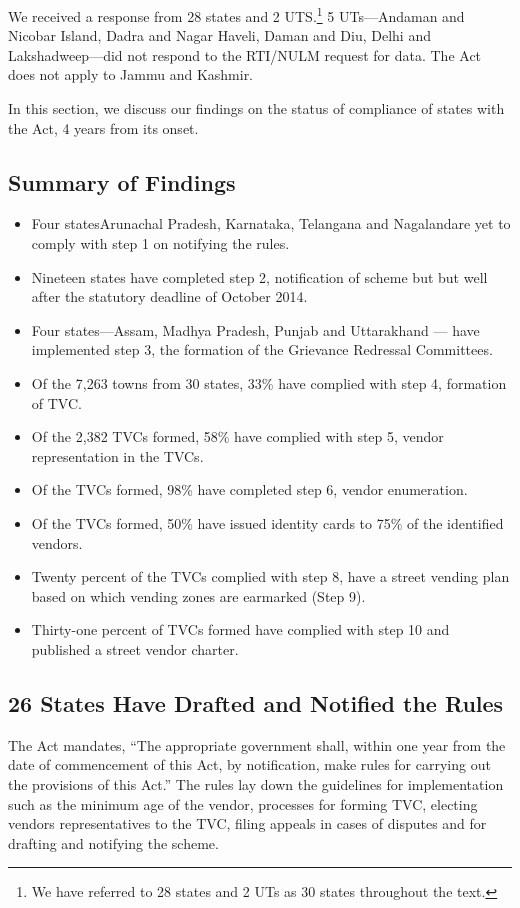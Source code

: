 \documentclass[a4paper, 12pt, twoside]{article}
\begin{document}
{	We received a response from 28 states and 2 UTS.\footnote{ We have referred to 28 states and 2 UTs as 30 states throughout the text.} 5 UTs—Andaman and Nicobar Island, Dadra and Nagar Haveli, Daman and Diu, Delhi and Lakshadweep—did not respond to the RTI/NULM request for data. The Act does not apply to Jammu and Kashmir.

	In this section, we discuss our findings on the status of compliance of states with the Act, 4 years from its onset.

\subsection*{Summary of Findings}

\begin{itemize}
	\item Four states\textemdash Arunachal Pradesh, Karnataka, Telangana and Nagaland\textemdash are yet to comply with step 1 on notifying the rules.
	\item Nineteen states have completed step 2, notification of scheme but but well after the statutory deadline of October 2014.
	\item Four states---Assam, Madhya Pradesh, Punjab and Uttarakhand --- have implemented step 3, the formation of the Grievance Redressal Committees.
	\item Of the 7,263 towns from 30 states, 33\% have complied with step 4, formation of TVC.
	\item Of the 2,382 TVCs formed, 58\% have complied with step 5, vendor representation in the TVCs.
	\item Of the TVCs formed, 98\% have completed step 6, vendor enumeration.
	\item Of the TVCs formed, 50\% have issued identity cards to 75\% of the identified vendors.
	\item Twenty percent of the TVCs complied with step 8, have a street vending plan based on which vending zones are earmarked (Step 9).
	\item Thirty-one percent of TVCs formed have complied with step 10 and published a street vendor charter.
\end{itemize}

\subsection*{26 States Have Drafted and Notified the Rules}
	The Act mandates, “The appropriate government shall, within one year from the date of commencement of this Act, by notification, make rules for carrying out the provisions of this Act.” The rules lay down the guidelines for implementation such as the minimum age of the vendor, processes for forming TVC, electing vendors representatives to the TVC, filing appeals in cases of disputes and for drafting and notifying the scheme.

}
\end{document}
